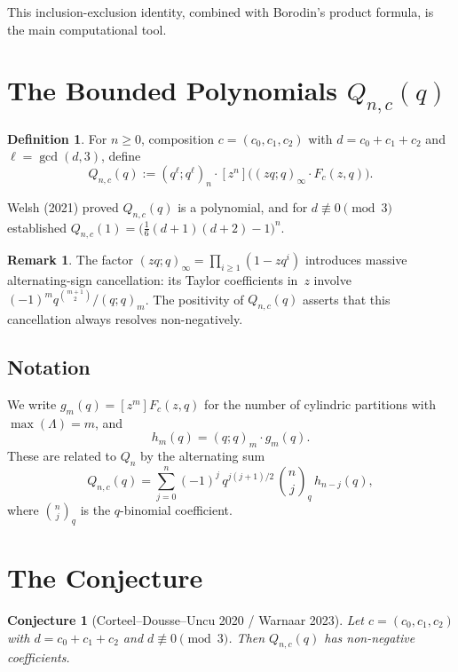 \documentclass[11pt]{article}
\newtheorem{conjecture}[theorem]{Conjecture}
\theoremstyle{definition}
\newtheorem{definition}[theorem]{Definition}
\newtheorem{remark}[theorem]{Remark}
\begin{document}
This inclusion-exclusion identity, combined with Borodin's product formula, is the main computational tool.

\section{The Bounded Polynomials \texorpdfstring{$Q_{n,c}(q)$}{Q\_n,c(q)}}\label{sec:Qn}

\begin{definition}\label{def:Qn}
For $n \geq 0$, composition $c = (c_0, c_1, c_2)$ with $d = c_0 + c_1 + c_2$ and $\ell = \gcd(d, 3)$, define
\[
Q_{n,c}(q) := (q^\ell; q^\ell)_n \cdot [z^n]\!\big((zq;q)_\infty \cdot F_c(z,q)\big).
\]
\end{definition}

Welsh (2021) proved $Q_{n,c}(q)$ is a polynomial, and for $d \not\equiv 0 \pmod{3}$ established $Q_{n,c}(1) = \bigl(\tfrac{1}{6}(d+1)(d+2) - 1\bigr)^n$.

\begin{remark}
The factor $(zq;q)_\infty = \prod_{i \geq 1}(1 - zq^i)$ introduces massive alternating-sign cancellation: its Taylor coefficients in~$z$ involve $(-1)^m q^{\binom{m+1}{2}} / (q;q)_m$. The positivity of $Q_{n,c}(q)$ asserts that this cancellation always resolves non-negatively.
\end{remark}

\subsection{Notation}

We write $g_m(q) = [z^m] F_c(z,q)$ for the number of cylindric partitions with $\max(\Lambda) = m$, and
\[
h_m(q) = (q;q)_m \cdot g_m(q).
\]
These are related to $Q_n$ by the alternating sum
\begin{equation}\label{eq:altsum}
Q_{n,c}(q) = \sum_{j=0}^n (-1)^j\, q^{j(j+1)/2}\, \binom{n}{j}_{\!q}\, h_{n-j}(q),
\end{equation}
where $\binom{n}{j}_q$ is the $q$-binomial coefficient.

\section{The Conjecture}\label{sec:conjecture}

\begin{conjecture}[Corteel--Dousse--Uncu 2020 / Warnaar 2023]\label{conj:main}
Let $c = (c_0, c_1, c_2)$ with $d = c_0 + c_1 + c_2$ and $d \not\equiv 0 \pmod{3}$. Then $Q_{n,c}(q)$ has non-negative coefficients.
\end{conjecture}
\end{document}
